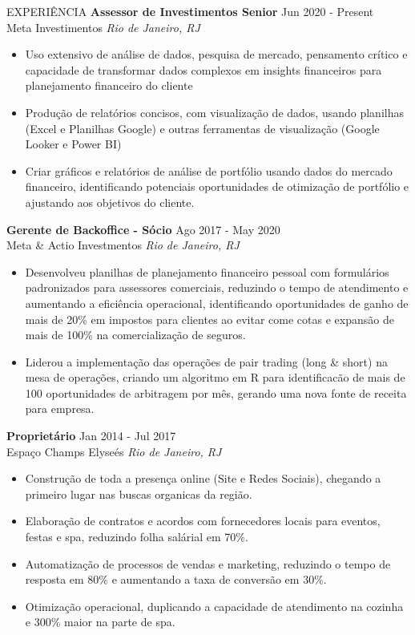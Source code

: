 \documentclass{resume}
\begin{document}
\vspace{-1em}
\begin{rSection}{EXPERIÊNCIA}
\textbf{Assessor de Investimentos Senior} \hfill Jun 2020 - Present\\
Meta Investimentos \hfill \textit{Rio de Janeiro, RJ}
{\footnotesize
\begin{itemize}
    \itemsep -3pt {} 
     \item Uso extensivo de análise de dados, pesquisa de mercado, pensamento crítico e capacidade de transformar dados complexos em insights financeiros para planejamento financeiro do cliente
     \item Produção de relatórios concisos, com visualização de dados, usando planilhas (Excel e Planilhas Google) e outras ferramentas de visualização (Google Looker e Power BI)
     \item Criar gráficos e relatórios de análise de portfólio usando dados do mercado financeiro, identificando potenciais oportunidades de otimização de portfólio e ajustando aos objetivos do cliente.
 \end{itemize}
}
\textbf{Gerente de Backoffice - Sócio} \hfill Ago 2017 - May 2020\\
Meta \& Actio Investmentos \hfill \textit{Rio de Janeiro, RJ}
{\footnotesize
\begin{itemize}
    \itemsep -3pt {} 
    \item Desenvolveu planilhas de planejamento financeiro pessoal com formulários padronizados para assessores comerciais, reduzindo o tempo de atendimento e aumentando a eficiência operacional, identificando oportunidades de ganho de mais de 20\% em impostos para clientes ao evitar come cotas e expansão de mais de 100\% na comercialização de seguros.
    \item Liderou a implementação das operações de pair trading (long \& short) na mesa de operações, criando um algoritmo em R para identificacão de mais de 100 oportunidades de arbitragem por mês, gerando uma nova fonte de receita para empresa.
\end{itemize}
}
\textbf{Proprietário} \hfill Jan 2014 - Jul 2017\\
Espaço Champs Elyseés \hfill \textit{Rio de Janeiro, RJ}
{\footnotesize
\begin{itemize}
    \itemsep -3pt {} 
    \item Construção de toda a presença online (Site e Redes Sociais), chegando a primeiro lugar nas buscas organicas da região.
    \item Elaboração de contratos e acordos com fornecedores locais para eventos, festas e spa, reduzindo folha salárial em 70\%.
    \item Automatização de processos de vendas e marketing, reduzindo o tempo de resposta em 80\% e aumentando a taxa de conversão em 30\%.
    \item Otimização operacional, duplicando a capacidade de atendimento na cozinha e 300\% maior na parte de spa.
\end{itemize}
}
\end{rSection} 
\end{document}

